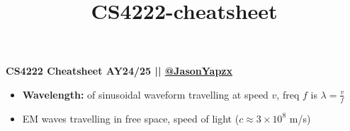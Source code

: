 \documentclass[10pt,landscape]{article}
\title{CS4222-cheatsheet}
\makeatletter
\newcommand{\subsubsubsection}{\@startsection{subsubsection}{3}{0mm}%
                                {-1ex plus -.5ex minus -.2ex}%
                                {1ex plus .2ex}%
                                {\normalfont\scriptsize\bfseries}}
\newcommand{\1}{\mathmybb{1}}
\makeatother
\begin{document}
\raggedright
\scriptsize


\begin{multicols*}{3}
\setlength{\premulticols}{0.1pt}
\setlength{\postmulticols}{0.1pt}
\setlength{\multicolsep}{0.1pt}
\setlength{\columnsep}{0.1pt}
\begin{tiny}
    \small{\textbf{CS4222 Cheatsheet AY24/25 || \href{https://github.com/JasonYapzx}{@JasonYapzx}}} \\
\end{tiny}

\begin{itemize}
    \item \textbf{Wavelength:} of sinusoidal waveform travelling at speed $v$, freq $f$ is $\lambda = \frac{v}{f}$
    \item EM waves travelling in free space, speed of light ($c \approx 3 \times 10^8$ m/s)
\end{itemize}



\end{multicols*}
\end{document}
